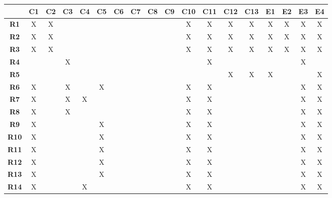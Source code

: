 \begin{table}[H]
    \centering
    \begin{tabular}{|c|c|c|c|c|c|c|c|c|c|c|c|c|c|c|c|c|c|}
        \hline &   
        \textbf{C1}   &
        \textbf{C2}   &
        \textbf{C3}   &
        \textbf{C4}   &
        \textbf{C5}   &
        \textbf{C6}   &
        \textbf{C7}   &
        \textbf{C8}   &
        \textbf{C9}   &  
        \textbf{C10}  &   
        \textbf{C11}  &  
        \textbf{C12}  & 
        \textbf{C13}  & 
        \textbf{E1}   &
        \textbf{E2}   & 
        \textbf{E3}   &  
        \textbf{E4} \\ \hline
        \textbf{R1}  & X & X &   &   &   &   &   &   &   & X & X & X & X & X & X & X & X \\ \hline
        \textbf{R2}  & X & X &   &   &   &   &   &   &   & X & X & X & X & X & X & X & X \\ \hline
        \textbf{R3}  & X & X &   &   &   &   &   &   &   & X & X & X & X & X & X & X & X \\ \hline
        \textbf{R4}  &   &   & X &   &   &   &   &   &   &   & X &   &   &   &   & X &   \\ \hline
        \textbf{R5}  &   &   &   &   &   &   &   &   &   &   &   & X & X & X &   &   & X \\ \hline
        \textbf{R6}  & X &   & X &   & X &   &   &   &   & X & X &   &   &   &   & X & X \\ \hline
        \textbf{R7}  & X &   & X & X &   &   &   &   &   & X & X &   &   &   &   & X & X \\ \hline
        \textbf{R8}  & X &   & X &   &   &   &   &   &   & X & X &   &   &   &   & X & X \\ \hline
        \textbf{R9}  & X &   &   &   & X &   &   &   &   & X & X &   &   &   &   & X & X \\ \hline
        \textbf{R10} & X &   &   &   & X &   &   &   &   & X & X &   &   &   &   & X & X \\ \hline
        \textbf{R11} & X &   &   &   & X &   &   &   &   & X & X &   &   &   &   & X & X \\ \hline
        \textbf{R12} & X &   &   &   & X &   &   &   &   & X & X &   &   &   &   & X & X \\ \hline
        \textbf{R13} & X &   &   &   & X &   &   &   &   & X & X &   &   &   &   & X & X \\ \hline
        \textbf{R14} & X &   &   & X &   &   &   &   &   & X & X &   &   &   &   & X & X \\ \hline

\end{tabular}
\end{table}
